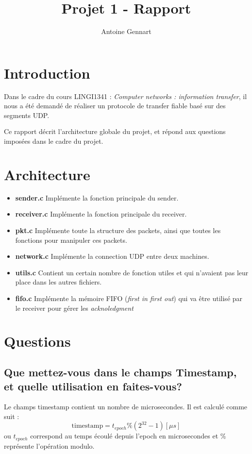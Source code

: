 \documentclass[10pt,a4paper]{article}
\author{Antoine Gennart}
\title{Projet 1 - Rapport}
\begin{document}
\maketitle


\section{Introduction}
Dans le cadre du cours LINGI1341 : \textit{Computer networks : information transfer}, il nous a été demandé de réaliser un protocole de transfer fiable basé sur des segments UDP.

Ce rapport décrit l'architecture globale du projet, et répond aux questions imposées dans le cadre du projet.

\section{Architecture}

\begin{itemize}
	\item \textbf{sender.c} Implémente la fonction principale du sender.
	\item \textbf{receiver.c} Implémente la fonction principale du receiver.
	\item \textbf{pkt.c} Implémente toute la structure des packets, ainsi que toutes les fonctions pour manipuler ces packets.
	\item \textbf{network.c} Implémente la connection UDP entre deux machines.
	\item \textbf{utils.c} Contient un certain nombre de fonction utiles et qui n'avaient pas leur place dans les autres fichiers.
	\item \textbf{fifo.c} Implémente la mémoire FIFO (\textit{first in first out}) qui va être utilisé par le receiver pour gérer les \textit{acknoledgment}
\end{itemize}

\section{Questions}
\subsection{Que mettez-vous dans le champs Timestamp, et quelle utilisation en faites-vous?}
Le champs timestamp contient un nombre de microsecondes. Il est calculé comme suit : 
\begin{equation*}
	\text{timestamp} = t_{epoch} \% (2^{32}-1) [\mu s]
\end{equation*}
ou $t_{epoch}$ correspond au temps écoulé depuis l'epoch en microsecondes et \% représente l'opération modulo.
\end{document}
